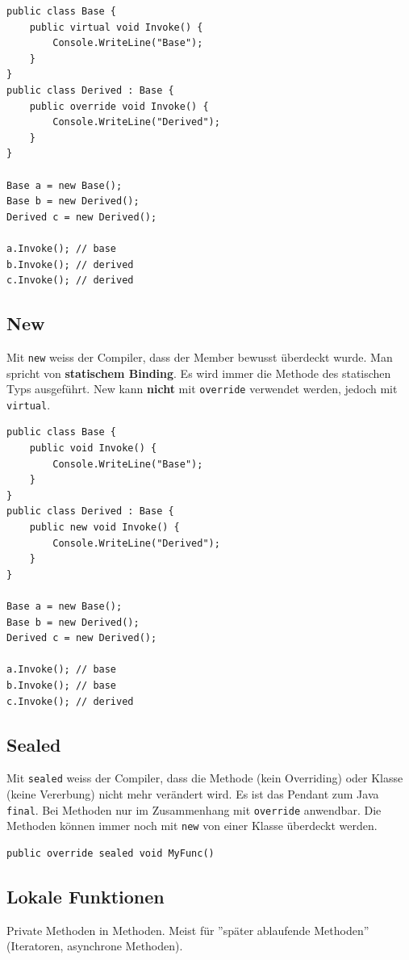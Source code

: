 \documentclass[
a4paper,
oneside,
10pt,
fleqn,
headsepline,
toc=listofnumbered, 
bibliography=totocnumbered]{scrartcl}
\begin{document}
\begin{lstlisting}
public class Base {
	public virtual void Invoke() {
		Console.WriteLine("Base");
	}
}
public class Derived : Base {
	public override void Invoke() {
		Console.WriteLine("Derived");
	}
}

Base a = new Base();
Base b = new Derived();
Derived c = new Derived();

a.Invoke(); // base
b.Invoke(); // derived
c.Invoke(); // derived
\end{lstlisting}

\clearpage

\subsection{New}
Mit \lstinline|new| weiss der Compiler, dass der Member bewusst überdeckt wurde. Man spricht von \textbf{statischem Binding}. Es wird immer die Methode des statischen Typs ausgeführt. New kann \textbf{nicht} mit \lstinline|override| verwendet werden, jedoch mit \lstinline|virtual|.
\begin{lstlisting} 
public class Base {
	public void Invoke() {
		Console.WriteLine("Base");
	}
}
public class Derived : Base {
	public new void Invoke() {
		Console.WriteLine("Derived");
	}
}

Base a = new Base();
Base b = new Derived();
Derived c = new Derived();

a.Invoke(); // base
b.Invoke(); // base
c.Invoke(); // derived
\end{lstlisting}

\subsection{Sealed}
Mit \lstinline|sealed| weiss der Compiler, dass die Methode (kein Overriding) oder Klasse (keine Vererbung) nicht mehr verändert wird. Es ist das Pendant zum Java \lstinline|final|. Bei Methoden nur im Zusammenhang mit \lstinline|override| anwendbar. Die Methoden können immer noch mit \lstinline|new| von einer Klasse überdeckt werden.
\begin{lstlisting} 
public override sealed void MyFunc()
\end{lstlisting}

\subsection{Lokale Funktionen}
Private Methoden in Methoden. Meist für ''später ablaufende Methoden'' (Iteratoren, asynchrone Methoden).
\end{document}

